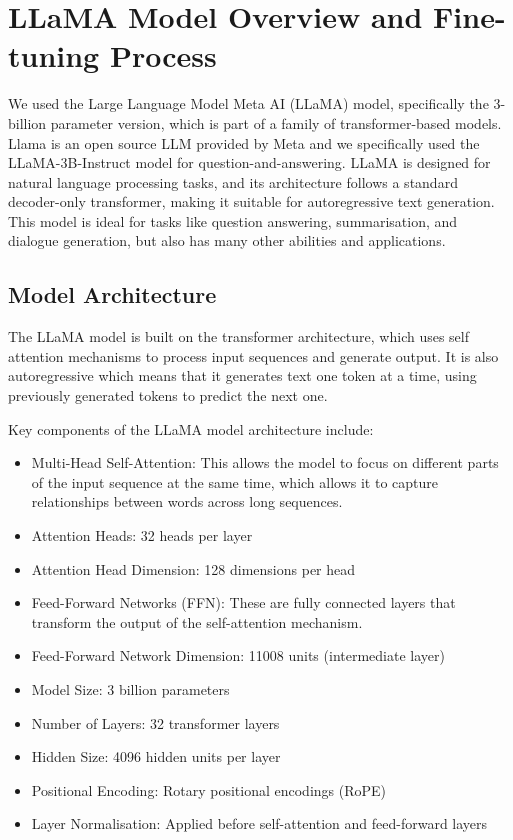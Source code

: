 \documentclass{article}
\begin{document}
\section{LLaMA Model Overview and Fine-tuning Process}

We used the Large Language Model Meta AI (LLaMA) model, specifically the 3-billion parameter version,
which is part of a family of transformer-based models. Llama is an open source LLM provided by Meta
and we specifically used the LLaMA-3B-Instruct model for question-and-answering. LLaMA is designed for natural
language processing tasks, and its architecture follows a standard decoder-only transformer,
making it suitable for autoregressive text generation. This model is ideal for tasks like question answering,
summarisation, and dialogue generation, but also has many other abilities and applications.

\subsection{Model Architecture}
The LLaMA model is built on the transformer architecture, which uses self attention mechanisms to process input
sequences and generate output. It is also autoregressive which means that it generates text one token at a time,
using previously generated tokens to predict the next one.

Key components of the LLaMA model architecture include:
\begin{itemize}
    \item Multi-Head Self-Attention: This allows the model to focus on different parts of the input sequence at the same time, which allows it to capture relationships between words across long sequences.
    \item Attention Heads: 32 heads per layer
    \item Attention Head Dimension: 128 dimensions per head
    \item Feed-Forward Networks (FFN): These are fully connected layers that transform the output of the self-attention mechanism.
    \item Feed-Forward Network Dimension: 11008 units (intermediate layer)
    \item Model Size: 3 billion parameters
    \item Number of Layers: 32 transformer layers
    \item Hidden Size: 4096 hidden units per layer
    \item Positional Encoding: Rotary positional encodings (RoPE)
    \item Layer Normalisation: Applied before self-attention and feed-forward layers
\end{itemize}
\end{document}
